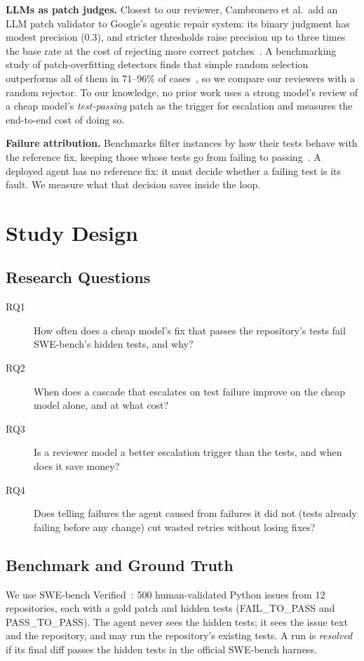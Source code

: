 \documentclass[10pt,conference]{IEEEtran}
\begin{document}
\textbf{LLMs as patch judges.} Closest to our reviewer, Cambronero et al.\ add an LLM patch validator to Google's
agentic repair system: its binary judgment has modest precision (0.3), and stricter thresholds raise precision up to
three times the base rate at the cost of rejecting more correct patches~\cite{cambronero2025}. A benchmarking study of patch-overfitting detectors finds that simple random selection outperforms all of them in
71--96\% of cases~\cite{williams2026}, so we compare our reviewers with a random rejector. To our knowledge, no prior work
uses a strong model's review of a cheap model's \emph{test-passing} patch as the trigger for escalation and measures
the end-to-end cost of doing so.

\textbf{Failure attribution.} Benchmarks filter instances by how their tests behave with the reference fix, keeping
those whose tests go from failing to passing~\cite{swebench,tddbench}. A deployed agent has no reference fix: it must
decide whether a failing test is its fault. We measure what that
decision saves inside the loop.

\section{Study Design}

\subsection{Research Questions}
\begin{description}
\item[RQ1] How often does a cheap model's fix that passes the repository's tests fail SWE-bench's hidden tests, and why?
\item[RQ2] When does a cascade that escalates on test failure improve on the cheap model alone, and at what cost?
\item[RQ3] Is a reviewer model a better escalation trigger than the tests, and when does it save money?
\item[RQ4] Does telling failures the agent caused from failures it did not (tests already failing before any change)
cut wasted retries without losing fixes?
\end{description}

\subsection{Benchmark and Ground Truth}
We use SWE-bench Verified~\cite{swebenchverified}: 500 human-validated Python issues from 12 repositories, each with
a gold patch and hidden tests (FAIL\_TO\_PASS and PASS\_TO\_PASS). The agent never sees the hidden tests; it sees the
issue text and the repository, and may run the repository's existing tests. A run is \emph{resolved} if its final
diff passes the hidden tests in the official SWE-bench harness.
\end{document}
